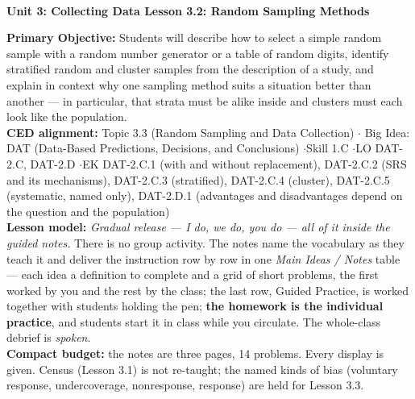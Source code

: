 \documentclass[10pt]{article}
\newcommand{\UnitNumberName}{Unit 3: Collecting Data \quad}
\newcommand{\LessonNumberName}{Lesson 3.2: Random Sampling Methods}
\begin{document}
\begin{center}
    {\Large\bfseries \CourseName \\
    {\small\bfseries \UnitNumberName \LessonNumberName}}
\end{center}

\begin{tcolorbox}[colback=sky, colframe=navy, boxrule=0.9pt, arc=2mm,
    left=2mm, right=2mm, top=1.5mm, bottom=1.5mm]
    \textbf{Primary Objective:} Students will describe how to select a simple random sample
    with a random number generator or a table of random digits, identify stratified random and
    cluster samples from the description of a study, and explain in context why one sampling
    method suits a situation better than another --- in particular, that strata must be alike
    inside and clusters must each look like the population.
    \\[2pt]
    \textbf{CED alignment:} Topic 3.3 (Random Sampling and Data Collection) \quad$\cdot$\quad
    Big Idea: DAT (Data-Based Predictions, Decisions, and Conclusions) \quad$\cdot$\quad Skill
    1.C \quad$\cdot$\quad LO DAT-2.C, DAT-2.D \quad$\cdot$\quad EK DAT-2.C.1 (with and without
    replacement), DAT-2.C.2 (SRS and its mechanisms), DAT-2.C.3 (stratified), DAT-2.C.4
    (cluster), DAT-2.C.5 (systematic, named only), DAT-2.D.1 (advantages and disadvantages
    depend on the question and the population)
    \\[2pt]
    \textbf{Lesson model:} \emph{Gradual release --- I do, we do, you do --- all of it inside
    the guided notes.} There is no group activity. The notes name the vocabulary as they teach
    it and deliver the instruction row by row in one \emph{Main Ideas / Notes} table --- each
    idea a definition to complete and a grid of short problems, the first worked by you and the
    rest by the class; the last row, Guided Practice, is worked together with students holding
    the pen; \textbf{the homework is the individual practice}, and students start it in class
    while you circulate. The whole-class debrief is \emph{spoken}.
    \\[2pt]
    \textbf{Compact budget:} the notes are three pages, 14 problems. Every display is given.
    Census (Lesson 3.1) is not re-taught; the named kinds of bias (voluntary response,
    undercoverage, nonresponse, response) are held for Lesson 3.3.
\end{tcolorbox}
\end{document}
